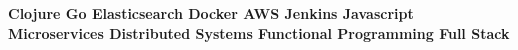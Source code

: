 
\newlength{\skillsSpaceTop}
\setlength{\skillsSpaceTop}{35pt}
\newlength{\skillsSpaceBottom}
\setlength{\skillsSpaceBottom}{30pt}

\begin{cvskills}

  \cvskill
    {} {\textbf{ Clojure \hspace{\skillsSpaceTop}  Go \hspace{\skillsSpaceTop}  Elasticsearch \hspace{\skillsSpaceTop} Docker \hspace{\skillsSpaceTop} AWS \hspace{\skillsSpaceTop} Jenkins \hspace{\skillsSpaceTop} Javascript}}
   \cvskill
    {} {\textbf{ \hspace{15pt} Microservices \hspace{\skillsSpaceBottom} Distributed Systems \hspace{\skillsSpaceBottom}  Functional Programming  \hspace{\skillsSpaceBottom}Full Stack}}  

 

\end{cvskills}
